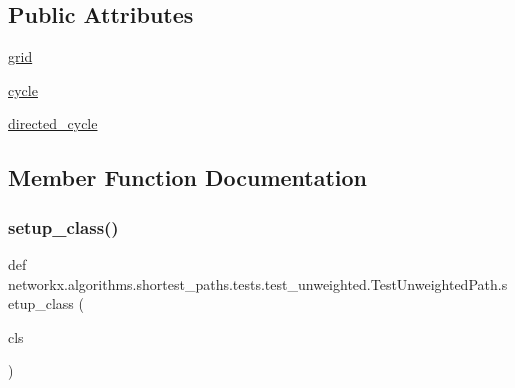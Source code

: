 \subsection*{Public Attributes}
\begin{DoxyCompactItemize}
\item 
\hyperlink{classnetworkx_1_1algorithms_1_1shortest__paths_1_1tests_1_1test__unweighted_1_1TestUnweightedPath_aea35ef8270158ab9af0e6792fb834153}{grid}
\item 
\hyperlink{classnetworkx_1_1algorithms_1_1shortest__paths_1_1tests_1_1test__unweighted_1_1TestUnweightedPath_aad1e14dc872d996f50415f766a054af7}{cycle}
\item 
\hyperlink{classnetworkx_1_1algorithms_1_1shortest__paths_1_1tests_1_1test__unweighted_1_1TestUnweightedPath_aee0a67811d735aac546ec4f48defccea}{directed\+\_\+cycle}
\end{DoxyCompactItemize}


\subsection{Member Function Documentation}
\mbox{\label{classnetworkx_1_1algorithms_1_1shortest__paths_1_1tests_1_1test__unweighted_1_1TestUnweightedPath_a31058f3c0ca3ebd1b9273450600bb8bb}} 
\subsubsection{\texorpdfstring{setup\+\_\+class()}{setup\_class()}}
{\footnotesize\ttfamily def networkx.\+algorithms.\+shortest\+\_\+paths.\+tests.\+test\+\_\+unweighted.\+Test\+Unweighted\+Path.\+setup\+\_\+class (\begin{DoxyParamCaption}\item[{}]{cls }\end{DoxyParamCaption})}

